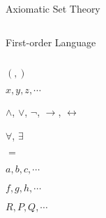 
\begin{frame}{}
  \begin{center}
    {\Large Axiomatic Set Theory }
  \end{center}

  \vspace{0.80cm}
  \begin{columns}
  \end{columns}
\end{frame}

\begin{frame}{}
  \begin{center}
    {\Large First-order Language}
  \end{center}

  \begin{columns}
      \begin{description}[Connectives:]
	\item[Parentheses:] $(,)$
	\item[Variables:] $x, y, z, \cdots$
	\item[Connectives:] $\land$, $\lor$, $\lnot$, $\to$, $\leftrightarrow$
	\item[Quantifiers:] $\forall$, $\exists$
	\item[Equality:] $=$
	  \pause \vspace{0.50cm}
	\item[Constants:] $a, b, c, \cdots$
	\item[Functions:] $f, g, h, \cdots$
	\item[Predicates:] $R, P, Q, \cdots$
      \end{description}
  \end{columns}
\end{frame}

